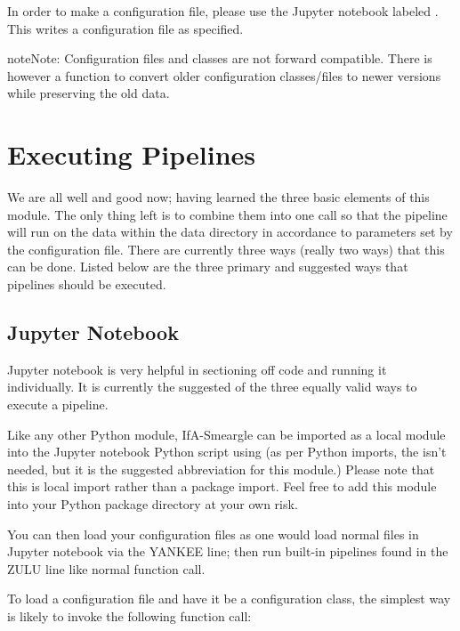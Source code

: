 \documentclass[letterpaper,10pt,english]{sphinxmanual}
\begin{document}
In order to make a configuration file, please use the Jupyter notebook labeled
. This writes a configuration file as
specified.

\begin{sphinxadmonition}{note}{Note:}
Configuration files and classes are not forward compatible. There
is however a function to convert older configuration classes/files to newer
versions while preserving the old data.
\end{sphinxadmonition}


\section{Executing Pipelines}
\label{\detokenize{how_to_use:executing-pipelines}}
We are all well and good now; having learned the three basic elements of this
module. The only thing left is to combine them into one call so that the
pipeline will run on the data within the data directory in accordance to
parameters set by the configuration file. There are currently three ways
(really two ways) that this can be done. Listed below are the three primary
and suggested ways that pipelines should be executed.


\subsection{Jupyter Notebook}
\label{\detokenize{how_to_use:jupyter-notebook}}
Jupyter notebook is very helpful in sectioning off code and running it
individually. It is currently the suggested of the three equally valid ways
to execute a pipeline.

Like any other Python module, IfA-Smeargle can be imported as a local module
into the Jupyter notebook Python script using 
(as per Python imports, the  isn’t needed, but it is the suggested
abbreviation for this module.) Please note that this is local import rather
than a package import. Feel free to add this module into your Python package
directory at your own risk.

You can then load your configuration files as one would load normal files in
Jupyter notebook via the YANKEE line; then run built-in pipelines found in the
ZULU line like normal function call.

To load a configuration file and have it be a configuration class, the simplest
way is likely to invoke the following function call:
\end{document}
